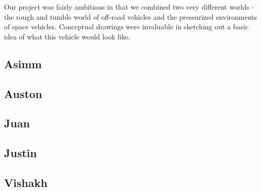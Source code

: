 Our project was fairly ambitious in that we combined two very different worlds - the rough and tumble world of off-road vehicles and the pressurized environments of space vehicles. Conceptual drawings were invaluable in sketching out a basic idea of what this vehicle would look like.

\newcommand{\Conceptual}[1]{
 \subsection{#1}
  
 \clearpage
}

\Conceptual{Asimm}
\Conceptual{Auston}
\Conceptual{Juan}
\Conceptual{Justin}
\Conceptual{Vishakh}
